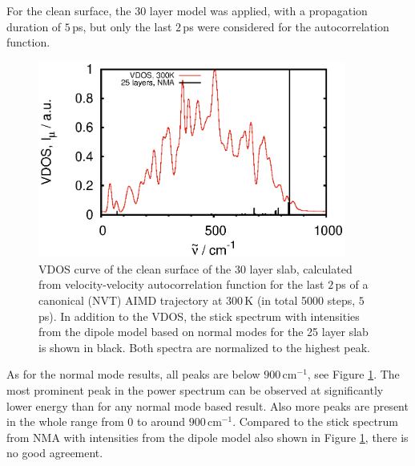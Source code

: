 \documentclass[11pt,DIV=13,BCOR=5mm,a4paper,headinclude]{scrbook}
\begin{document}
For the clean surface, the 30 layer model was applied, with a propagation duration of $5\,$ps, but only the last $2\,$ps were considered for the autocorrelation function.
\begin{figure}[!h]
    \centering
    \includegraphics[width=0.9\textwidth]{figures/11-20/comp_cleansurf_all.eps}%
             \caption{VDOS curve of the clean surface of the 30 layer slab, calculated from velocity-velocity autocorrelation function for the last $2\,$ps of a canonical (NVT) AIMD trajectory at $300\,$K (in total 5000 steps, $5\,$ps).
In addition to the VDOS, the stick spectrum with intensities from the dipole model based on normal modes for the 25 layer slab is shown in black.
Both spectra are normalized to the highest peak.}
\label{abb:velvelclean}
\end{figure}
As for the normal mode results, all peaks are below $900\,$cm$^{-1}$, see Figure \ref{abb:velvelclean}.
The most prominent peak in the power spectrum can be observed at significantly lower energy than for any normal mode based result.
Also more peaks are present in the whole range from $0$ to around $900\,$cm$^{-1}$.
Compared to the stick spectrum from NMA with intensities from the dipole model also shown in Figure \ref{abb:velvelclean}, there is no good agreement.
\\\\
\end{document}
